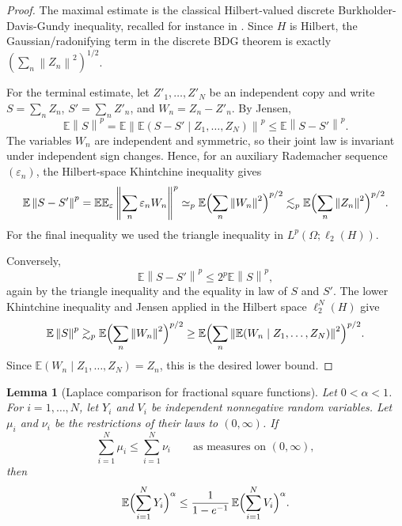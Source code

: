 \documentclass[11pt]{article}
\newtheorem{lemma}{Lemma}
\newcommand{\E}{\mathbb E}
\newcommand{\norm}[1]{\left\lVert #1\right\rVert}
\newcommand{\simequiv}{\simeq}
\begin{document}
\begin{proof}
The maximal estimate is the classical Hilbert-valued discrete
Burkholder-Davis-Gundy inequality, recalled for instance in
\cite{Yaroslavtsev2018}.  Since \(H\) is Hilbert, the Gaussian/radonifying
term in the discrete BDG theorem is exactly
\((\sum_n\norm{Z_n}^2)^{1/2}\).

For the terminal estimate, let \(Z'_1,\ldots,Z'_N\) be an independent copy and
write \(S=\sum_n Z_n\), \(S'=\sum_n Z'_n\), and \(W_n=Z_n-Z'_n\).  By Jensen,
\[
   \E\norm{S}^p
   =
   \E\norm{\E(S-S'\mid Z_1,\ldots,Z_N)}^p
   \leq
   \E\norm{S-S'}^p .
\]
The variables \(W_n\) are independent and symmetric, so their joint law is
invariant under independent sign changes.  Hence, for an auxiliary Rademacher
sequence \((\varepsilon_n)\), the Hilbert-space Khintchine inequality gives
\[
   \E\norm{S-S'}^p
   =
   \E\E_\varepsilon\norm{\sum_n\varepsilon_nW_n}^p
   \simequiv_p
   \E\Bigl(\sum_n\norm{W_n}^2\Bigr)^{p/2}
   \lesssim_p
   \E\Bigl(\sum_n\norm{Z_n}^2\Bigr)^{p/2}.
\]
For the final inequality we used the triangle inequality in
\(L^p(\Omega;\ell_2(H))\).

Conversely,
\[
   \E\norm{S-S'}^p
   \leq
   2^p\E\norm{S}^p,
\]
again by the triangle inequality and the equality in law of \(S\) and \(S'\).
The lower Khintchine inequality and Jensen applied in the Hilbert space
\(\ell_2^N(H)\) give
\[
   \E\norm{S}^p
   \gtrsim_p
   \E\Bigl(\sum_n\norm{W_n}^2\Bigr)^{p/2}
   \geq
   \E\Bigl(\sum_n\norm{\E(W_n\mid Z_1,\ldots,Z_N)}^2\Bigr)^{p/2}.
\]
Since \(\E(W_n\mid Z_1,\ldots,Z_N)=Z_n\), this is the desired lower bound.
\end{proof}

\begin{lemma}[Laplace comparison for fractional square functions]
\label{lem:laplace-square}
Let \(0<\alpha<1\).  For \(i=1,\ldots,N\), let \(Y_i\) and \(V_i\) be
independent nonnegative random variables.  Let \(\mu_i\) and \(\nu_i\) be the
restrictions of their laws to \((0,\infty)\).  If
\[
   \sum_{i=1}^N\mu_i \leq \sum_{i=1}^N\nu_i
   \qquad\text{as measures on }(0,\infty),
\]
then
\[
   \E\Bigl(\sum_{i=1}^N Y_i\Bigr)^\alpha
   \leq
   \frac{1}{1-e^{-1}}\,
   \E\Bigl(\sum_{i=1}^N V_i\Bigr)^\alpha .
\]
\end{lemma}
\end{document}
